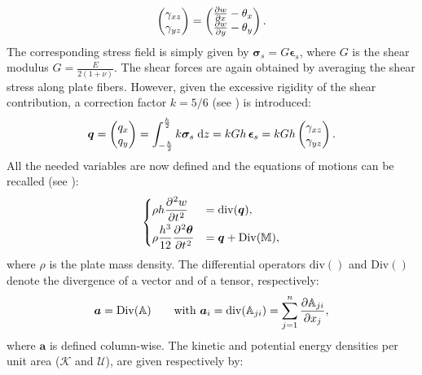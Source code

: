 \documentclass[preprint,12pt]{elsarticle}
\begin{document}
{\begin{equation}
\begin{pmatrix}
\gamma_{xz} \\
\gamma_{yz} \\
\end{pmatrix} = 
\begin{pmatrix}
\diffp{w}{x} - \theta_x \\
\diffp{w}{y} - \theta_y \\
\end{pmatrix}.
\end{equation}
The corresponding stress field is simply given by $\bm\sigma_s = G \bm{\epsilon}_s$, where $G$ is the shear modulus $G = \frac{E}{2 (1 + \nu)}$. The shear forces are again obtained by averaging the shear stress along plate fibers. However, given the excessive rigidity of the shear contribution, a correction factor $k = 5/6$ (see \cite{mindlin}) is introduced:
\begin{equation}
	\bm{q} = \begin{pmatrix}
	q_x \\
	q_y \\
	\end{pmatrix} =
	\int_{-\frac{h}{2} }^{ \frac{h}{2} } k \bm\sigma_s \d{z} = k G h \, \bm{\epsilon}_s = k G h
	\begin{pmatrix}
	\gamma_{xz} \\
	\gamma_{yz} \\
	\end{pmatrix}.
\end{equation}
All the needed variables are now defined and the equations of motions can be recalled (see \cite{mindlin}): 
\begin{equation}
\begin{cases}
\displaystyle \rho h \diffp[2]{w}{t} &= \mathrm{div}(\bm{q}),  \vspace{1mm}\\
\displaystyle \rho\frac{h^3}{12} \diffp[2]{\bm \theta}{t} &= \bm{q} + \mathrm{Div}(\mathbb{M}), \\
\end{cases}
\end{equation}
where $\rho$ is the plate mass density. The differential operators $\mathrm{div}()$ and $\mathrm{Div}()$ denote the divergence of a vector and of a tensor, respectively:
\begin{equation*}
\bm{a} = \mathrm{Div}(\mathbb{A})  \qquad \text{with } \bm{a}_i = \mathrm{div}(\mathbb{A}_{ji}) = \sum_{j = 1}^n \diffp{\mathbb{A}_{ji}}{x_j},
\end{equation*}
where $\bm{a}$ is defined column-wise. The kinetic and potential energy densities per unit area ($\mathcal{K}$ and $\mathcal{U}$), are given respectively by:
}
\end{document}
